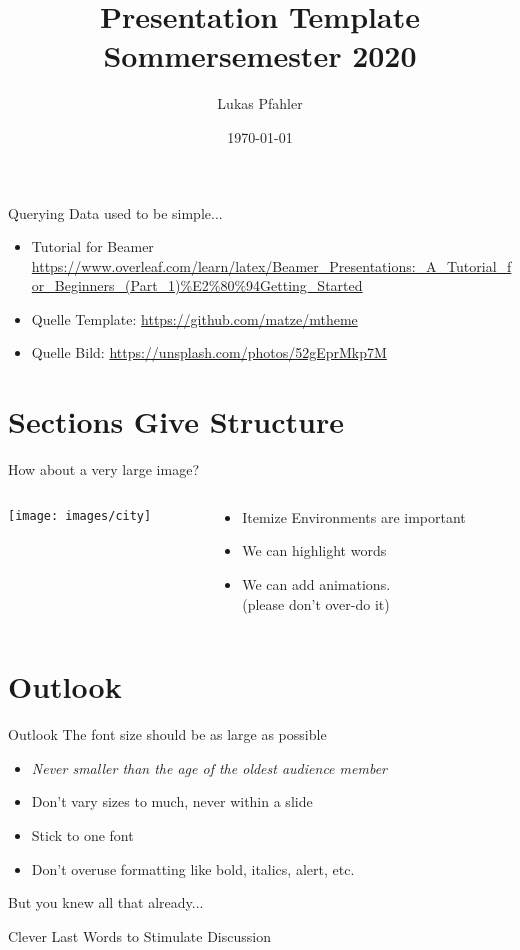 \documentclass[aspectratio=169,10pt]{beamer}
\title{Presentation Template Sommersemester 2020}
\author{Lukas Pfahler}
\institute{TU Dortmund University - Department of Computer Science}
\date{\today}
\begin{document}
\begin{frame}[t,fragile]{Querying Data used to be simple...}
  \begin{itemize}
      \item Tutorial for Beamer \url{https://www.overleaf.com/learn/latex/Beamer_Presentations:_A_Tutorial_for_Beginners_(Part_1)%E2%80%94Getting_Started}
      \item Quelle Template: \url{https://github.com/matze/mtheme}
      \item Quelle Bild: \url{https://unsplash.com/photos/52gEprMkp7M}
  \end{itemize}
\end{frame}

\section{Sections Give Structure}

\begin{frame}[fragile]{How about a very large image?}

\begin{columns}
    \begin{column}{0.57\paperwidth}
        \vspace{0.5pt}
        \texttt{[image: images/city]}
    \end{column}
    \begin{column}[c]{0.43\paperwidth}
        \begin{itemize}
        \item Itemize Environments are important
        \item We can \alert{highlight} words
        \pause
        \item We can add animations.\\(please don't over-do it)
        \end{itemize}
    \end{column}
\end{columns}
\end{frame}

\section{Outlook}
\begin{frame}{Outlook}
\Large
The font size should be as large as possible
\begin{itemize}
\item \textit{Never smaller than the age of the oldest audience member}
\item Don't vary sizes to much, never within a slide
\item Stick to one font
\item Don't overuse formatting like bold, italics, alert, etc.
\end{itemize}
But you knew all that already...
\end{frame}

\begin{frame}[t,standout]
\Large
Clever Last Words to Stimulate Discussion
\end{frame}
\end{document}

